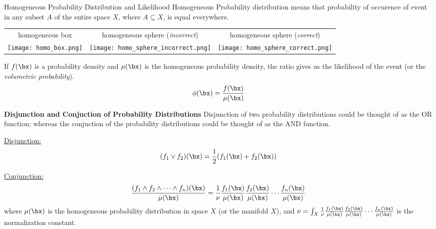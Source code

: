 \documentclass[11pt,titlepage,fleqn]{article}
\begin{document}
\begin{section}{Homogeneous Probability Distribution and Likelihood}
Homogeneous Probability distribution means that probability of occurence of event in any subset $A$ of the entire space $X$, where $A \subseteq X$, is equal everywhere.
\\

\begin{tabular}{c|cc}
homogeneous box &
homogeneous sphere ({\it incorrect}) &
homogeneous sphere ({\it correct}) \\
\hspace{-2.5cm}
\texttt{[image: homo\_box.png]} &
\hspace{-1.cm}
\texttt{[image: homo\_sphere\_incorrect.png]} &
\hspace{-1.75cm}
\texttt{[image: homo\_sphere\_correct.png]} \\
\end{tabular}

If $f(\bx)$ is a probability density and $\mu(\bx)$ is the homogeneous probability density, the ratio gives us the likelihood of the event (or the {\it volumetric probability}).
\begin{equation}
\phi(\bx) = \frac{f(\bx)}{\mu(\bx)}
\end{equation}


{\bf Disjunction and Conjuction of Probability Distributions}
Disjunction of two probability distributions could be thought of as the OR function; whereas the conjuction of the probability distributions could be thought of as the AND function.

\underline{Disjunction:}
\begin{equation}
(f_1 \vee f_2)(\bx) = \frac{1}{2}(f_1(\bx) + f_2(\bx))
\end{equation}

\underline{Conjunction:}
\begin{equation}
\frac{(f_1 \wedge f_2 \wedge \cdots \wedge  f_n)(\bx)}{\mu(\bx)} = \frac{1}{\nu} \frac{f_1(\bx)}{\mu(\bx)} \frac{f_2(\bx)}{\mu(\bx)} \cdots \frac{f_n(\bx)}{\mu(\bx)}
\end{equation}
where $\mu(\bx)$ is the homogeneous probability distribution in space $X$ (or the manifold $X$), and $\nu = \int_X \frac{1}{\nu} \frac{f_1(\bx)}{\mu(\bx)} \frac{f_2(\bx)}{\mu(\bx)} \cdots \frac{f_n(\bx)}{\mu(\bx)}$ is the normalization constant.

\end{section}
\end{document}

